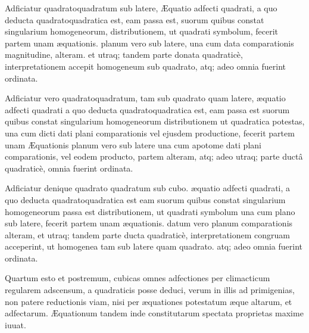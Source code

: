 \documentclass[11pt,a4paper]{article}
\begin{document}
Adficiatur quadratoquadratum sub latere, Æquatio adfecti quadrati, a quo deducta quadratoquadratica est, eam passa est, suorum quibus constat singularium homogeneorum, distributionem, ut quadrati symbolum, fecerit partem unam æquationis. planum vero sub latere, una cum data comparationis magnitudine, alteram. et utraq; tandem parte donata quadraticè, interpretationem  accepit homogeneum sub quadrato, atq; adeo omnia fuerint ordinata.


Adficiatur vero quadratoquadratum, tam sub quadrato quam latere, æquatio adfecti quadrati a quo deducta quadratoquadratica est, eam passa est suorum quibus constat singularium homogeneorum distributionem ut quadratica potestas, una cum dicti dati plani comparationis vel ejusdem productione, fecerit partem unam Æquationis planum vero sub latere una cum apotome dati plani comparationis, vel eodem producto, partem alteram, atq; adeo utraq; parte ductâ quadraticè, omnia fuerint ordinata.

Adficiatur denique quadrato quadratum sub cubo. æquatio adfecti quadrati, a quo deducta quadratoquadratica est eam suorum quibus constat singularium homogeneorum passa est distributionem, ut quadrati symbolum una cum plano sub latere, fecerit partem unam æquationis. datum vero planum comparationis alteram, et utraq; tandem parte ducta quadraticè, interpretationem congruam acceperint, ut homogenea tam sub latere quam quadrato. atq; adeo omnia fuerint ordinata.

Quartum esto et postremum, cubicas omnes adfectiones per climacticum regularem adscensum, a quadraticis posse deduci, verum in illis ad primigenias, non patere reductionis viam, nisi per æquationes potestatum æque altarum, et adfectarum. Æquationum tandem inde constitutarum spectata proprietas maxime iuuat.
\end{document}
